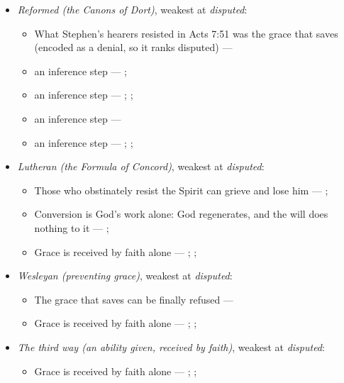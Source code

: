\documentclass[11pt]{article}
\begin{document}
\begin{itemize}
\begin{itemize}
\end{itemize}
\item \emph{Reformed (the Canons of Dort)}, weakest at \emph{disputed}:
\begin{itemize}
\item What Stephen’s hearers resisted in Acts 7:51 was the grace that saves (encoded as a denial, so it ranks disputed) --- \cite[Canons of Dort, III/IV, art. 9]{schaff-creeds-christendom-3-1977}
\item an inference step --- \cite[ad loc. Eph 2:8]{robertson-word-pictures-4-1931}; \cite[228--229]{calvin-galatians-ephesians-1854}
\item an inference step --- \cite[600]{arminius-works-1-1825}; \cite[681]{arminius-works-1-1825}; \cite[Five Arminian Articles (1610), art. 4]{schaff-creeds-christendom-3-1977}
\item an inference step --- \cite[527--565]{arminius-works-3-1853}
\item an inference step --- \cite[Solid Declaration II.89]{concordia-triglotta-1921}; \cite[Solid Declaration II.60]{concordia-triglotta-1921}; \cite[Solid Declaration XI.41]{concordia-triglotta-1921}
\end{itemize}
\item \emph{Lutheran (the Formula of Concord)}, weakest at \emph{disputed}:
\begin{itemize}
\item Those who obstinately resist the Spirit can grieve and lose him --- \cite[Solid Declaration II.83]{concordia-triglotta-1921}; \cite[Solid Declaration XI.42]{concordia-triglotta-1921}
\item Conversion is God’s work alone: God regenerates, and the will does nothing to it --- \cite[Solid Declaration II.89]{concordia-triglotta-1921}; \cite[Solid Declaration II.90]{concordia-triglotta-1921}
\item Grace is received by faith alone --- \cite[Augsburg Confession IV.1–3]{concordia-triglotta-1921}; \cite[Sermon 1, III.1]{wesley-sermons-1872}; \cite[Trent, Session VI (1547), canon 9]{tanner-decrees-1990}
\end{itemize}
\item \emph{Wesleyan (preventing grace)}, weakest at \emph{disputed}:
\begin{itemize}
\item The grace that saves can be finally refused --- \cite[397]{wesley-works-9-1827}
\item Grace is received by faith alone --- \cite[Augsburg Confession IV.1–3]{concordia-triglotta-1921}; \cite[Sermon 1, III.1]{wesley-sermons-1872}; \cite[Trent, Session VI (1547), canon 9]{tanner-decrees-1990}
\end{itemize}
\item \emph{The third way (an ability given, received by faith)}, weakest at \emph{disputed}:
\begin{itemize}
\item Grace is received by faith alone --- \cite[Augsburg Confession IV.1–3]{concordia-triglotta-1921}; \cite[Sermon 1, III.1]{wesley-sermons-1872}; \cite[Trent, Session VI (1547), canon 9]{tanner-decrees-1990}
\end{itemize}
\end{itemize}
\end{document}
